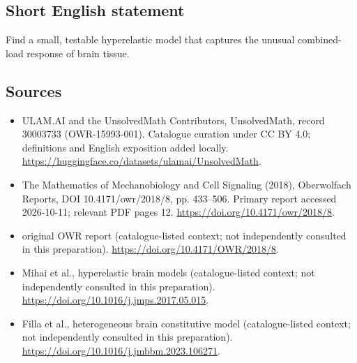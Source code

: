 \documentclass[11pt]{article}
\begin{document}
\subsection{Short English statement}
Find a small, testable hyperelastic model that captures the unusual combined-load response of brain tissue.
\subsection{Sources}
\begin{itemize}
\item[\hypertarget{source:30003733:1}{S1}] ULAM.AI and the UnsolvedMath Contributors, UnsolvedMath, record 30003733 (OWR-15993-001). Catalogue curation under CC BY 4.0; definitions and English exposition added locally.
\url{https://huggingface.co/datasets/ulamai/UnsolvedMath}.
\item[\hypertarget{source:30003733:2}{S2}] The Mathematics of Mechanobiology and Cell Signaling (2018), Oberwolfach Reports, DOI 10.4171/owr/2018/8, pp. 433--506. Primary report accessed 2026-10-11; relevant PDF pages 12.
\url{https://doi.org/10.4171/owr/2018/8}.
\item[\hypertarget{source:30003733:3}{S3}] original OWR report (catalogue-listed context; not independently consulted in this preparation).
\url{https://doi.org/10.4171/OWR/2018/8}.
\item[\hypertarget{source:30003733:4}{S4}] Mihai et al., hyperelastic brain models (catalogue-listed context; not independently consulted in this preparation).
\url{https://doi.org/10.1016/j.jmps.2017.05.015}.
\item[\hypertarget{source:30003733:5}{S5}] Filla et al., heterogeneous brain constitutive model (catalogue-listed context; not independently consulted in this preparation).
\url{https://doi.org/10.1016/j.jmbbm.2023.106271}.
\end{itemize}
\label{end:30003733}
\end{document}
